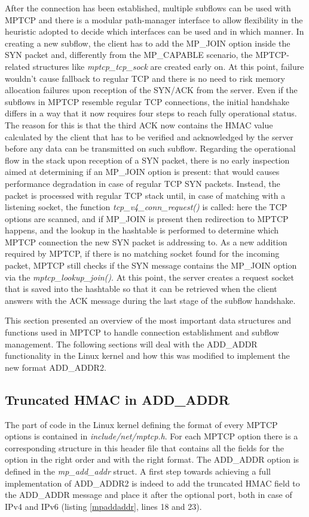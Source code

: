 After the connection has been established, multiple subflows can be used with MPTCP and there is a modular path-manager interface to allow flexibility in the heuristic adopted to decide which interfaces can be used and in which manner. In creating a new subflow, the client has to add the MP\_JOIN option inside the SYN packet and, differently from the MP\_CAPABLE scenario, the MPTCP-related structures like \textit{mptcp\_tcp\_sock} are created early on. At this point, failure wouldn't cause fallback to regular TCP and there is no need to risk memory allocation failures upon reception of the SYN/ACK from the server. Even if the subflows in MPTCP resemble regular TCP connections, the initial handshake differs in a way that it now requires four steps to reach fully operational status. The reason for this is that the third ACK now contains the HMAC value calculated by the client that has to be verified and acknowledged by the server before any data can be transmitted on such subflow. 
Regarding the operational flow in the stack upon reception of a SYN packet, there is no early inspection aimed at determining if an MP\_JOIN option is present: that would causes performance degradation in case of regular TCP SYN packets. Instead, the packet is processed with regular TCP stack until, in case of matching with a listening socket, the function \textit{tcp\_v4\_conn\_request()} is called: here the TCP options are scanned, and if MP\_JOIN is present then redirection to MPTCP happens, and the lookup in the hashtable is performed to determine which MPTCP connection the new SYN packet is addressing to. As a new addition required by MPTCP, if there is no matching socket found for the incoming packet, MPTCP still checks if the SYN message contains the MP\_JOIN option via the \textit{mptcp\_lookup\_join()}. At this point, the server creates a request socket that is saved into the hashtable so that it can be retrieved when the client answers with the ACK message during the last stage of the subflow handshake.

This section presented an overview of the most important data structures and functions used in MPTCP to handle connection establishment and subflow management. The following sections will deal with the ADD\_ADDR functionality in the Linux kernel and how this was modified to implement the new format ADD\_ADDR2.

\subsection{Truncated HMAC in ADD\_ADDR}
The part of code in the Linux kernel defining the format of every MPTCP options is contained in \textit{include/net/mptcp.h}. For each MPTCP option there is a corresponding structure in this header file that contains all the fields for the option in the right order and with the right format. The ADD\_ADDR option is defined in the \textit{mp\_add\_addr} struct. A first step towards achieving a full implementation of ADD\_ADDR2 is indeed to add the truncated HMAC field to the ADD\_ADDR message and place it after the optional port, both in case of IPv4 and IPv6 (listing \ref{mpaddaddr}, lines 18 and 23).

